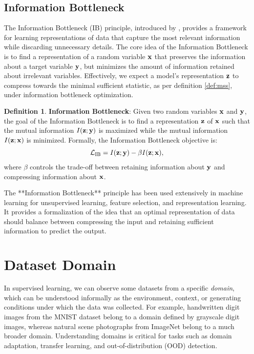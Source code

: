 \documentclass[11pt, oneside]{book}
\theoremstyle{plain}
\theoremstyle{definition}
\newtheorem{definition}[theorem]{Definition}
\theoremstyle{remark}
\begin{document}
\subsection{Information Bottleneck}

The Information Bottleneck (IB) principle, introduced by \cite{tishby2000information}, provides a framework for learning representations of data that capture the most relevant information while discarding unnecessary details. The core idea of the Information Bottleneck is to find a representation of a random variable ${\mathbf{x}}$ that preserves the information about a target variable ${\mathbf{y}}$, but minimizes the amount of information retained about irrelevant variables. Effectively, we expect a model's representation ${\mathbf{z}}$ to compress towards the minimal sufficient statistic, as per definition \ref{def:mss}, under information bottleneck optimization.

\begin{definition}
\textbf{Information Bottleneck}: Given two random variables ${\mathbf{x}}$ and ${\mathbf{y}}$, the goal of the Information Bottleneck is to find a representation ${\mathbf{z}}$ of ${\mathbf{x}}$ such that the mutual information $I({\mathbf{z}}; {\mathbf{y}})$ is maximized while the mutual information $I({\mathbf{z}}; {\mathbf{x}})$ is minimized. Formally, the Information Bottleneck objective is:
\[
\mathcal{L}_{\text{IB}} = I({\mathbf{z}}; {\mathbf{y}}) - \beta I({\mathbf{z}}; {\mathbf{x}}),
\]
where $\beta$ controls the trade-off between retaining information about ${\mathbf{y}}$ and compressing information about ${\mathbf{x}}$.
\label{def:ib}
\end{definition}

The **Information Bottleneck** principle has been used extensively in machine learning for unsupervised learning, feature selection, and representation learning. It provides a formalization of the idea that an optimal representation of data should balance between compressing the input and retaining sufficient information to predict the output.

\section{Dataset Domain}

In supervised learning, we can observe some datasets from a specific \textit{domain}, which can be understood informally as the environment, context, or generating conditions under which the data was collected. For example, handwritten digit images from the MNIST dataset belong to a domain defined by grayscale digit images, whereas natural scene photographs from ImageNet belong to a much broader domain. Understanding domains is critical for tasks such as domain adaptation, transfer learning, and out-of-distribution (OOD) detection.
\end{document}
